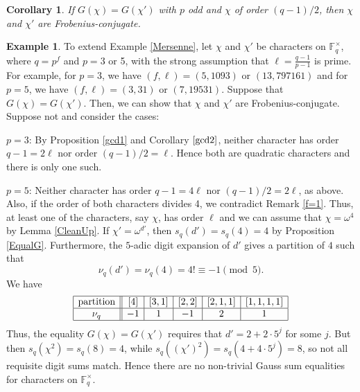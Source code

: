\documentclass[12pt]{amsart}  \usepackage{amsmath,amssymb,enumerate,amscd,tikz,url}
\numberwithin{equation}{section}
\newtheorem{cor}[equation]{Corollary}
\theoremstyle{definition}
\newtheorem{Ex}[equation]{Example}
\newcommand{\F}{{\mathbb F}}
\begin{document}
\begin{cor} \label{gcd2}
If $G(\chi) = G(\chi')$ with $p$ odd and $\chi$ of order $(q-1)/2$, then $\chi$ and $\chi'$ are Frobenius-conjugate.  
\end{cor}

\begin{Ex} \label{3^n}
To extend Example \ref{Mersenne}, let $\chi$ and $\chi'$ be characters on $\F_q^\times$, where $q = p^f$ and $p = 3$ or 5, with the strong assumption that $\ell = \frac{q-1}{p-1}$ is prime.  For example, for $p = 3$, we have $(f,\ell) =  (5, 1093)$ or $(13,797161)$ and for $p = 5$, we have $(f,\ell) = (3,31)$ or $(7,19531)$.  Suppose that $G(\chi) =  G(\chi')$. Then, we can show that $\chi$ and $\chi'$ are Frobenius-conjugate.  Suppose not and consider the cases:

\vspace{2  pt}

$p=3$:   By Proposition \ref{gcd1} and Corollary $\ref{gcd2}$, neither character has order $q-1 = 2\ell$ nor order $(q-1)/2 = \ell$.  Hence both are quadratic characters and there is only one such.

\vspace{2  pt}

$p=5$:  Neither character has order $q-1 = 4 \ell$ nor $(q-1)/2 = 2\ell$, as above.  Also, if the order of both characters divides 4, we contradict Remark \ref{f=1}.  Thus, at least one of the characters, say $\chi$, has order $\ell$ and we can assume that $\chi = \omega^4$ by Lemma \ref{CleanUp}.  If $\chi' = \omega^{d'}$, then $s_q(d') = s_q(4) =  4$ by Proposition \ref{EqualG}.  Furthermore, the $5$-adic digit expansion of $d'$ gives a partition of $4$ such that 
$$
\nu_q(d') = \nu_q(4) = 4! \equiv  -1 \pmod{5}.
$$
We have
$$
\begin{array} { | c || c | c | c | c | c |}
\hline
\text{partition} & [4] & [3,1] & [2,2] & [2,1,1] & [1,1,1,1] \\
\hline
\nu_q & -1 & 1 & -1 & 2 & 1 \\
\hline
\end{array}
$$
Thus, the equality $G(\chi) = G(\chi')$ requires that $d' = 2+2\cdot 5^j$ for some $j$.  But then $s_q(\chi^2) = s_q(8) = 4$, while $s_q((\chi')^2) = s_q(4+4\cdot 5^j) = 8$, so not all requisite digit sums match.  Hence there are no non-trivial Gauss sum equalities for characters on $\F_q^\times$.    
\end{Ex}

\vspace{5 pt}
\end{document}
